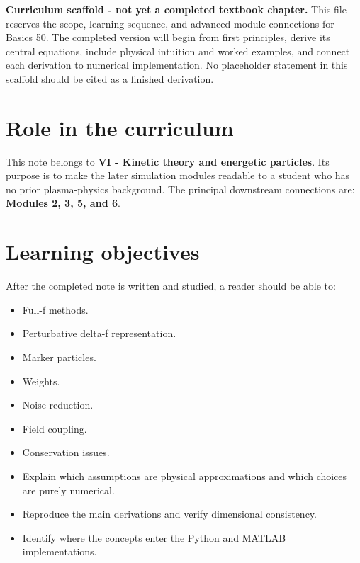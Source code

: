 \documentclass[11pt]{article}
\begin{document}

\begin{overviewbox}
\textbf{Curriculum scaffold - not yet a completed textbook chapter.} This file reserves the scope, learning sequence, and advanced-module connections for Basics 50. The completed version will begin from first principles, derive its central equations, include physical intuition and worked examples, and connect each derivation to numerical implementation. No placeholder statement in this scaffold should be cited as a finished derivation.
\end{overviewbox}

\ProjectTOC

\section{Role in the curriculum}
This note belongs to \textbf{VI - Kinetic theory and energetic particles}. Its purpose is to make the later simulation modules readable to a student who has no prior plasma-physics background. The principal downstream connections are: \textbf{Modules 2, 3, 5, and 6}.

\section{Learning objectives}
After the completed note is written and studied, a reader should be able to:
\begin{itemize}[leftmargin=1.6em]
\item Full-f methods.
\item Perturbative delta-f representation.
\item Marker particles.
\item Weights.
\item Noise reduction.
\item Field coupling.
\item Conservation issues.
\item Explain which assumptions are physical approximations and which choices are purely numerical.
\item Reproduce the main derivations and verify dimensional consistency.
\item Identify where the concepts enter the Python and MATLAB implementations.
\end{itemize}
\end{document}
